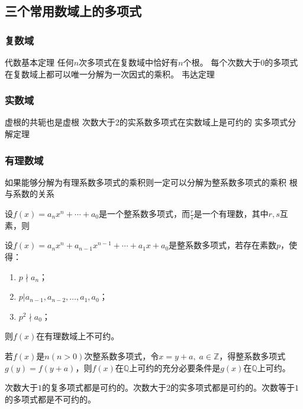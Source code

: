 \subsection{三个常用数域上的多项式}
\subsubsection{复数域}
代数基本定理
任何$n$次多项式在复数域中恰好有$n$个根。
每个次数大于$0$的多项式在复数域上都可以唯一分解为一次因式的乘积。
韦达定理

\subsubsection{实数域}
虚根的共轭也是虚根
次数大于$2$的实系数多项式在实数域上是可约的
实多项式分解定理

\subsubsection{有理数域}
如果能够分解为有理系数多项式的乘积则一定可以分解为整系数多项式的乘积
根与系数的关系
\begin{theorem}
	设$f(x)=a_nx^n+\cdots+a_0$是一个整系数多项式，而$\frac{r}{s}$是一个有理数，其中$r,s$互素，则
\end{theorem}
\begin{theorem}[艾森斯坦判别法]
	设$f(x)=a_nx^n+a_{n-1}x^{n-1}+\cdots+a_1x+a_0$是整系数多项式，若存在素数$p$，使得：
	\begin{enumerate}
		\item $p\nmid a_n$；
		\item $p|a_{n-1},a_{n-2},\dots,a_1,a_0$；
		\item $p^2\nmid a_0$；
	\end{enumerate}
	则$f(x)$在有理数域上不可约。
\end{theorem}
\begin{theorem}
	若$f(x)$是$n(n>0)$次整系数多项式，令$x=y+a,\;a\in\mathbb{Z}$，得整系数多项式$g(y)=f(y+a)$，则$f(x)$在$\mathbb{Q}$上可约的充分必要条件是$g(x)$在$\mathbb{Q}$上可约。
\end{theorem}
\begin{theorem}
	次数大于$1$的复多项式都是可约的。次数大于$2$的实多项式都是可约的。次数等于$1$的多项式都是不可约的。
\end{theorem}

